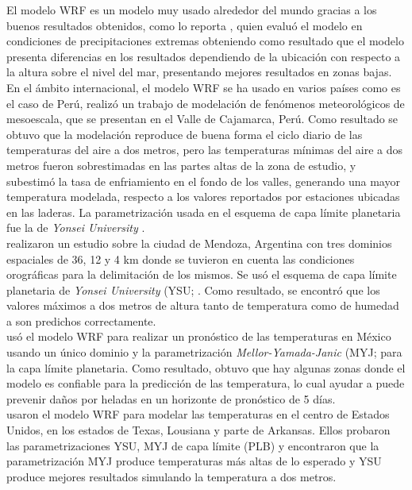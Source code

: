 El modelo WRF es un modelo muy usado alrededor del mundo gracias a los buenos resultados obtenidos, como lo reporta \citet{Jimenez2014}, quien evaluó el modelo en condiciones de precipitaciones extremas obteniendo como resultado que el modelo presenta diferencias en los resultados dependiendo de la ubicación con respecto a la altura sobre el nivel del mar, presentando mejores resultados en zonas bajas. En el ámbito internacional, el modelo WRF se ha usado en varios países como es el caso de Perú, \citet{Saavedra2016} realizó un trabajo de modelación de fenómenos meteorológicos de mesoescala, que se presentan en el Valle de Cajamarca, Perú. Como resultado se obtuvo que la modelación reproduce de buena forma el ciclo diario de las temperaturas del aire a dos metros, pero las temperaturas mínimas del aire a dos metros fueron sobrestimadas en las partes altas de la zona de estudio, y subestimó la tasa de enfriamiento en el fondo de los valles, generando una mayor temperatura modelada, respecto a los valores reportados por estaciones ubicadas en las laderas. La parametrización usada en el esquema de capa límite planetaria fue la de \textit{Yonsei University} \citep{Hong2006}.\\

\citet{Fernandez2011} realizaron un estudio sobre la ciudad de Mendoza, Argentina con tres dominios espaciales de 36, 12 y 4 km donde se tuvieron en cuenta las condiciones orográficas para la delimitación de los mismos. Se usó el esquema de capa límite planetaria de \textit{Yonsei University} (YSU; \citep{Hong2006}. Como resultado, se encontró que los valores máximos a dos metros de altura tanto de temperatura como de humedad a son predichos correctamente.\\

\citet{Corrales2015} usó el modelo WRF para realizar un pronóstico de las temperaturas en México usando un único dominio y la parametrización \textit{Mellor-Yamada-Janic} (MYJ; \citep{Janjic1994} para la capa límite planetaria. Como resultado, obtuvo que hay algunas zonas donde el modelo es confiable para la predicción de las temperatura, lo cual ayudar a puede prevenir daños por heladas en un horizonte de pronóstico de 5 días.\\

\citet{Hu2010} usaron el modelo WRF para modelar las temperaturas en el centro de Estados Unidos, en los estados de Texas, Lousiana y parte de Arkansas. Ellos probaron las  parametrizaciones YSU, MYJ de capa límite (PLB) y encontraron que la parametrización MYJ produce temperaturas más altas de lo esperado y YSU produce mejores resultados simulando la temperatura a dos metros.\\

